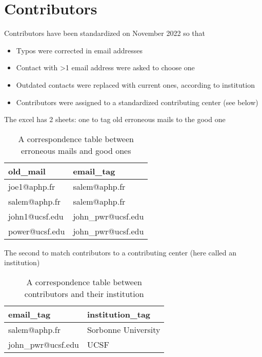 \documentclass[
]{book}
\begin{document}
\hypertarget{contributors}{%
\section{Contributors}\label{contributors}}

Contributors have been standardized on November 2022 so that

\begin{itemize}
\item
  Typos were corrected in email addresses
\item
  Contact with \textgreater1 email address were asked to choose one
\item
  Outdated contacts were replaced with current ones, according to institution
\item
  Contributors were assigned to a standardized contributing center (see below)
\end{itemize}

The excel has 2 sheets: one to tag old erroneous mails to the good one

\begin{table}

\caption{\label{tab:unnamed-chunk-7}A correspondence table between erroneous mails and good ones}
\centering
\begin{tabular}[t]{l|l}
\hline
old\_mail & email\_tag\\
\hline
joe1@aphp.fr & salem@aphp.fr\\
\hline
salem@aphp.fr & salem@aphp.fr\\
\hline
john1@ucsf.edu & john\_pwr@ucsf.edu\\
\hline
power@ucsf.edu & john\_pwr@ucsf.edu\\
\hline
\end{tabular}
\end{table}

The second to match contributors to a contributing center (here called an institution)

\begin{table}

\caption{\label{tab:unnamed-chunk-8}A correspondence table between contributors and their institution}
\centering
\begin{tabular}[t]{l|l}
\hline
email\_tag & institution\_tag\\
\hline
salem@aphp.fr & Sorbonne University\\
\hline
john\_pwr@ucsf.edu & UCSF\\
\hline
\end{tabular}
\end{table}
\end{document}
